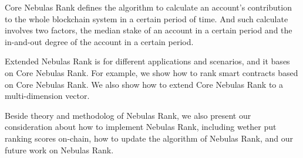 Core Nebulas Rank defines the algorithm to calculate an account's contribution
to the whole blockchain system in a certain period of time. And such
calculate involves two factors, the median stake of an account in a certain
period and the in-and-out degree of the account in a certain period.

Extended Nebulas Rank is for different applications and scenarios,
and it bases on Core Nebulas Rank. For example, we show how to rank smart
contracts based on Core Nebulas Rank. We also show how to extend Core
Nebulas Rank to a multi-dimension vector.

Beside theory and methodolog of Nebulas Rank, we also present our
consideration about how to implement Nebulas Rank, including wether
put ranking scores on-chain, how to update the algorithm of Nebulas Rank,
and our future work on Nebulas Rank.

